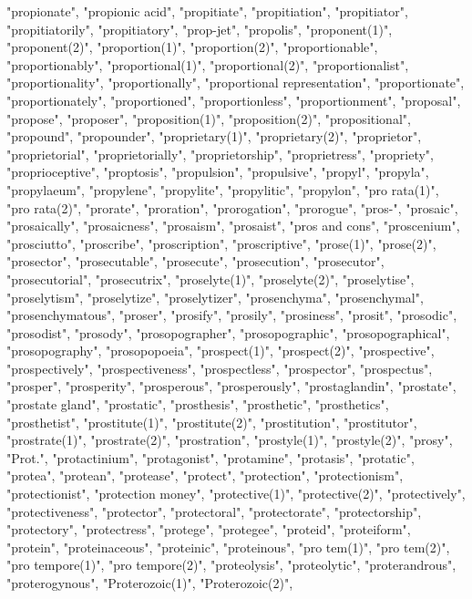 "propionate",
"propionic acid",
"propitiate",
"propitiation",
"propitiator",
"propitiatorily",
"propitiatory",
"prop-jet",
"propolis",
"proponent(1)",
"proponent(2)",
"proportion(1)",
"proportion(2)",
"proportionable",
"proportionably",
"proportional(1)",
"proportional(2)",
"proportionalist",
"proportionality",
"proportionally",
"proportional representation",
"proportionate",
"proportionately",
"proportioned",
"proportionless",
"proportionment",
"proposal",
"propose",
"proposer",
"proposition(1)",
"proposition(2)",
"propositional",
"propound",
"propounder",
"proprietary(1)",
"proprietary(2)",
"proprietor",
"proprietorial",
"proprietorially",
"proprietorship",
"proprietress",
"propriety",
"proprioceptive",
"proptosis",
"propulsion",
"propulsive",
"propyl",
"propyla",
"propylaeum",
"propylene",
"propylite",
"propylitic",
"propylon",
"pro rata(1)",
"pro rata(2)",
"prorate",
"proration",
"prorogation",
"prorogue",
"pros-",
"prosaic",
"prosaically",
"prosaicness",
"prosaism",
"prosaist",
"pros and cons",
"proscenium",
"prosciutto",
"proscribe",
"proscription",
"proscriptive",
"prose(1)",
"prose(2)",
"prosector",
"prosecutable",
"prosecute",
"prosecution",
"prosecutor",
"prosecutorial",
"prosecutrix",
"proselyte(1)",
"proselyte(2)",
"proselytise",
"proselytism",
"proselytize",
"proselytizer",
"prosenchyma",
"prosenchymal",
"prosenchymatous",
"proser",
"prosify",
"prosily",
"prosiness",
"prosit",
"prosodic",
"prosodist",
"prosody",
"prosopographer",
"prosopographic",
"prosopographical",
"prosopography",
"prosopopoeia",
"prospect(1)",
"prospect(2)",
"prospective",
"prospectively",
"prospectiveness",
"prospectless",
"prospector",
"prospectus",
"prosper",
"prosperity",
"prosperous",
"prosperously",
"prostaglandin",
"prostate",
"prostate gland",
"prostatic",
"prosthesis",
"prosthetic",
"prosthetics",
"prosthetist",
"prostitute(1)",
"prostitute(2)",
"prostitution",
"prostitutor",
"prostrate(1)",
"prostrate(2)",
"prostration",
"prostyle(1)",
"prostyle(2)",
"prosy",
"Prot.",
"protactinium",
"protagonist",
"protamine",
"protasis",
"protatic",
"protea",
"protean",
"protease",
"protect",
"protection",
"protectionism",
"protectionist",
"protection money",
"protective(1)",
"protective(2)",
"protectively",
"protectiveness",
"protector",
"protectoral",
"protectorate",
"protectorship",
"protectory",
"protectress",
"protege",
"protegee",
"proteid",
"proteiform",
"protein",
"proteinaceous",
"proteinic",
"proteinous",
"pro tem(1)",
"pro tem(2)",
"pro tempore(1)",
"pro tempore(2)",
"proteolysis",
"proteolytic",
"proterandrous",
"proterogynous",
"Proterozoic(1)",
"Proterozoic(2)",
